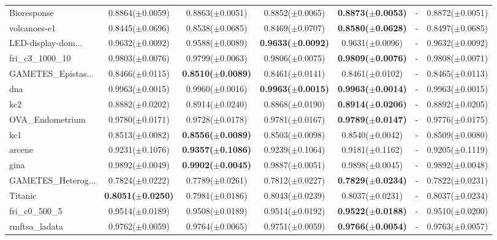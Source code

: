 \begin{longtable}{lcccccc}
Bioresponse & 0.8864($\pm$0.0059) & 0.8863($\pm$0.0051) & 0.8852($\pm$0.0065) & \textbf{0.8873($\pm$0.0053)} & - & 0.8872($\pm$0.0051) \\
volcanoes-e1 & 0.8445($\pm$0.0696) & 0.8538($\pm$0.0685) & 0.8469($\pm$0.0707) & \textbf{0.8580($\pm$0.0628)} & - & 0.8497($\pm$0.0685) \\
LED-display-dom... & 0.9632($\pm$0.0092) & 0.9588($\pm$0.0089) & \textbf{0.9633($\pm$0.0092)} & 0.9631($\pm$0.0096) & - & 0.9632($\pm$0.0092) \\
fri\_c3\_1000\_10 & 0.9803($\pm$0.0076) & 0.9799($\pm$0.0063) & 0.9806($\pm$0.0075) & \textbf{0.9809($\pm$0.0076)} & - & 0.9808($\pm$0.0071) \\
GAMETES\_Epistas... & 0.8466($\pm$0.0115) & \textbf{0.8510($\pm$0.0089)} & 0.8461($\pm$0.0141) & 0.8461($\pm$0.0102) & - & 0.8465($\pm$0.0113) \\
dna & 0.9963($\pm$0.0015) & 0.9960($\pm$0.0016) & \textbf{0.9963($\pm$0.0015)} & \textbf{0.9963($\pm$0.0014)} & - & 0.9963($\pm$0.0015) \\
kc2 & 0.8882($\pm$0.0202) & 0.8914($\pm$0.0240) & 0.8868($\pm$0.0190) & \textbf{0.8914($\pm$0.0206)} & - & 0.8892($\pm$0.0205) \\
OVA\_Endometrium & 0.9780($\pm$0.0171) & 0.9728($\pm$0.0178) & 0.9781($\pm$0.0167) & \textbf{0.9789($\pm$0.0147)} & - & 0.9776($\pm$0.0175) \\
kc1 & 0.8513($\pm$0.0082) & \textbf{0.8556($\pm$0.0089)} & 0.8503($\pm$0.0098) & 0.8540($\pm$0.0042) & - & 0.8509($\pm$0.0080) \\
arcene & 0.9231($\pm$0.1076) & \textbf{0.9357($\pm$0.1086)} & 0.9239($\pm$0.1064) & 0.9181($\pm$0.1162) & - & 0.9205($\pm$0.1119) \\
gina & 0.9892($\pm$0.0049) & \textbf{0.9902($\pm$0.0045)} & 0.9887($\pm$0.0051) & 0.9898($\pm$0.0045) & - & 0.9892($\pm$0.0048) \\
GAMETES\_Heterog... & 0.7824($\pm$0.0222) & 0.7789($\pm$0.0261) & 0.7812($\pm$0.0227) & \textbf{0.7829($\pm$0.0234)} & - & 0.7822($\pm$0.0231) \\
Titanic & \textbf{0.8051($\pm$0.0250)} & 0.7981($\pm$0.0186) & 0.8043($\pm$0.0239) & 0.8037($\pm$0.0231) & - & 0.8037($\pm$0.0234) \\
fri\_c0\_500\_5 & 0.9514($\pm$0.0189) & 0.9508($\pm$0.0189) & 0.9514($\pm$0.0192) & \textbf{0.9522($\pm$0.0188)} & - & 0.9510($\pm$0.0200) \\
rmftsa\_ladata & 0.9762($\pm$0.0059) & 0.9764($\pm$0.0065) & 0.9751($\pm$0.0059) & \textbf{0.9766($\pm$0.0054)} & - & 0.9763($\pm$0.0057) \\

\end{longtable}
